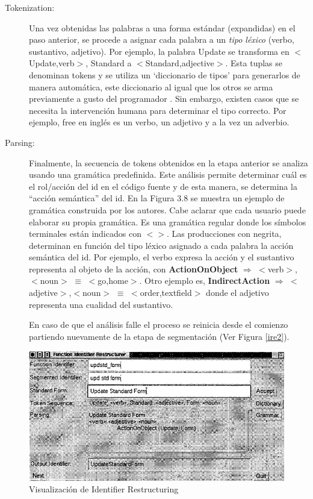 \begin{description}
\item[Tokenization:] Una vez obtenidas las palabras a una forma estándar (expandidas) en el paso anterior, se procede a asignar cada palabra a un \textit{tipo léxico} (verbo, sustantivo, adjetivo). Por ejemplo, la palabra \textsf{Update} se transforma en $<$Update,verb$>$, \textsf{Standard} a $<$Standard,adjective$>$. Esta tuplas se denominan tokens y se utiliza un `diccionario de tipos' para generarlos de manera automática, este diccionario al igual que los otros se arma previamente a gusto del programador \cite{BCPT99}. Sin embargo, existen casos que se necesita la intervención humana para determinar el tipo correcto. Por ejemplo, \textsf{free} en inglés es un verbo, un adjetivo y a la vez un adverbio.%

\item[Parsing:] Finalmente, la secuencia de tokens obtenidos en la etapa anterior se analiza usando una gramática predefinida. Este análisis permite determinar cuál es el rol/acción del id en el código fuente y de esta manera, se determina la “acción semántica” del id. 
En la Figura 3.8 se muestra un ejemplo de gramática construida por los autores. Cabe aclarar que cada usuario puede elaborar su propia gramática. 
Es una gramática regular donde los símbolos terminales están indicados con $<>$. Las producciones con negrita, determinan en función del tipo léxico asignado a cada palabra la acción semántica del id.
Por ejemplo, el verbo expresa la acción y el sustantivo representa al objeto de la acción, con \textbf{ActionOnObject} $\Rightarrow$ $<$verb$>$,$<$noun$>$ $\equiv$ $<$go,home$>$. Otro ejemplo es, \textbf{IndirectAction} $\Rightarrow$ $<$adjetive$>$,$<$noun$>$ $\equiv$ $<$order,textfield$>$ donde el adjetivo representa una cualidad del sustantivo.

En caso de que el análisis falle el proceso se reinicia desde el comienzo partiendo nuevamente de la etapa de segmentación \cite{BCPT00} (Ver Figura \ref{ire2}).
\end{description}

\begin{figure}[ht] %
\centerline{%
\includegraphics[scale= 0.67]{./cap3/ire_4.png}
}
\caption{Visualización de Identifier Restructuring}
\label{ire4}
\end{figure}

